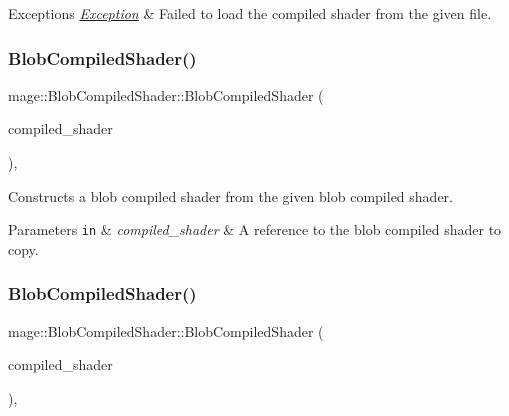 \begin{DoxyExceptions}{Exceptions}
{\em \hyperlink{classmage_1_1_exception}{Exception}} & Failed to load the compiled shader from the given file. \\
\hline
\end{DoxyExceptions}
\hypertarget{classmage_1_1_blob_compiled_shader_adc98af382bdedb7f407494187b900c1f}{}\label{classmage_1_1_blob_compiled_shader_adc98af382bdedb7f407494187b900c1f} 
\subsubsection{\texorpdfstring{Blob\+Compiled\+Shader()}{BlobCompiledShader()}\hspace{0.1cm}{\footnotesize\ttfamily [2/3]}}
{\footnotesize\ttfamily mage\+::\+Blob\+Compiled\+Shader\+::\+Blob\+Compiled\+Shader (\begin{DoxyParamCaption}\item[{const \hyperlink{classmage_1_1_blob_compiled_shader}{Blob\+Compiled\+Shader} \&}]{compiled\+\_\+shader }\end{DoxyParamCaption})\hspace{0.3cm}{\ttfamily [default]}, {\ttfamily [noexcept]}}

Constructs a blob compiled shader from the given blob compiled shader.


\begin{DoxyParams}[1]{Parameters}
\mbox{\tt in}  & {\em compiled\+\_\+shader} & A reference to the blob compiled shader to copy. \\
\hline
\end{DoxyParams}
\hypertarget{classmage_1_1_blob_compiled_shader_afa486af89d0df11bafe200496e8d0b93}{}\label{classmage_1_1_blob_compiled_shader_afa486af89d0df11bafe200496e8d0b93} 
\subsubsection{\texorpdfstring{Blob\+Compiled\+Shader()}{BlobCompiledShader()}\hspace{0.1cm}{\footnotesize\ttfamily [3/3]}}
{\footnotesize\ttfamily mage\+::\+Blob\+Compiled\+Shader\+::\+Blob\+Compiled\+Shader (\begin{DoxyParamCaption}\item[{\hyperlink{classmage_1_1_blob_compiled_shader}{Blob\+Compiled\+Shader} \&\&}]{compiled\+\_\+shader }\end{DoxyParamCaption})\hspace{0.3cm}{\ttfamily [default]}, {\ttfamily [noexcept]}}

